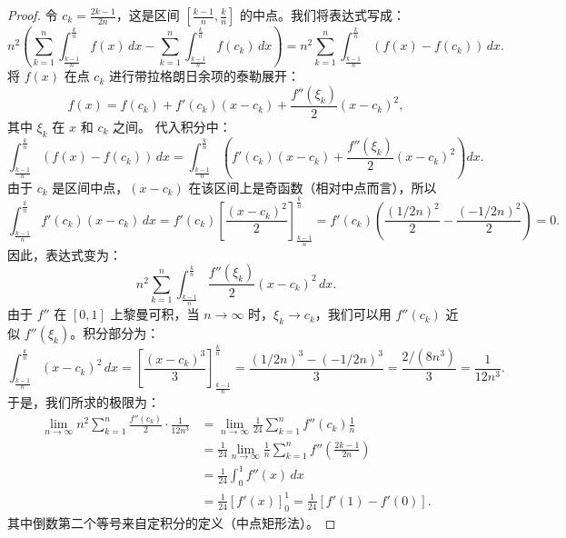 \documentclass[lang=cn,10pt,thmcnt=section]{elegantbook}
\begin{document}
\begin{proof}
    令 $c_k = \frac{2k-1}{2n}$，这是区间 $[\frac{k-1}{n}, \frac{k}{n}]$ 的中点。我们将表达式写成：
    \[
    n^2 \left( \sum_{k=1}^n \int_{\frac{k-1}{n}}^{\frac{k}{n}} f(x) \, dx - \sum_{k=1}^n \int_{\frac{k-1}{n}}^{\frac{k}{n}} f(c_k) \, dx \right) = n^2 \sum_{k=1}^n \int_{\frac{k-1}{n}}^{\frac{k}{n}} (f(x) - f(c_k)) \, dx.
    \]
    将 $f(x)$ 在点 $c_k$ 进行带拉格朗日余项的泰勒展开：
    \[
    f(x) = f(c_k) + f'(c_k)(x-c_k) + \frac{f''(\xi_k)}{2}(x-c_k)^2,
    \]
    其中 $\xi_k$ 在 $x$ 和 $c_k$ 之间。
    代入积分中：
    \[
    \int_{\frac{k-1}{n}}^{\frac{k}{n}} (f(x) - f(c_k)) \, dx = \int_{\frac{k-1}{n}}^{\frac{k}{n}} \left( f'(c_k)(x-c_k) + \frac{f''(\xi_k)}{2}(x-c_k)^2 \right) dx.
    \]
    由于 $c_k$ 是区间中点，$(x-c_k)$ 在该区间上是奇函数（相对中点而言），所以
    \[
    \int_{\frac{k-1}{n}}^{\frac{k}{n}} f'(c_k)(x-c_k) \, dx = f'(c_k) \left[\frac{(x-c_k)^2}{2}\right]_{\frac{k-1}{n}}^{\frac{k}{n}} = f'(c_k) \left( \frac{(1/2n)^2}{2} - \frac{(-1/2n)^2}{2} \right) = 0.
    \]
    因此，表达式变为：
    \[
    n^2 \sum_{k=1}^n \int_{\frac{k-1}{n}}^{\frac{k}{n}} \frac{f''(\xi_k)}{2}(x-c_k)^2 \, dx.
    \]
    由于 $f''$ 在 $[0,1]$ 上黎曼可积，当 $n \to \infty$ 时，$\xi_k \to c_k$，我们可以用 $f''(c_k)$ 近似 $f''(\xi_k)$。积分部分为：
    \[
    \int_{\frac{k-1}{n}}^{\frac{k}{n}} (x-c_k)^2 \, dx = \left[\frac{(x-c_k)^3}{3}\right]_{\frac{k-1}{n}}^{\frac{k}{n}} = \frac{(1/2n)^3 - (-1/2n)^3}{3} = \frac{2/(8n^3)}{3} = \frac{1}{12n^3}.
    \]
    于是，我们所求的极限为：
    \begin{align*}
        \lim_{n \to \infty} n^2 \sum_{k=1}^n \frac{f''(c_k)}{2} \cdot \frac{1}{12n^3} &= \lim_{n \to \infty} \frac{1}{24} \sum_{k=1}^n f''(c_k) \frac{1}{n} \\
        &= \frac{1}{24} \lim_{n \to \infty} \frac{1}{n} \sum_{k=1}^n f''\left(\frac{2k-1}{2n}\right) \\
        &= \frac{1}{24} \int_0^1 f''(x) \, dx \\
        &= \frac{1}{24} [f'(x)]_0^1 = \frac{1}{24} [f'(1) - f'(0)].
    \end{align*}
    其中倒数第二个等号来自定积分的定义（中点矩形法）。
\end{proof}
\end{document}
